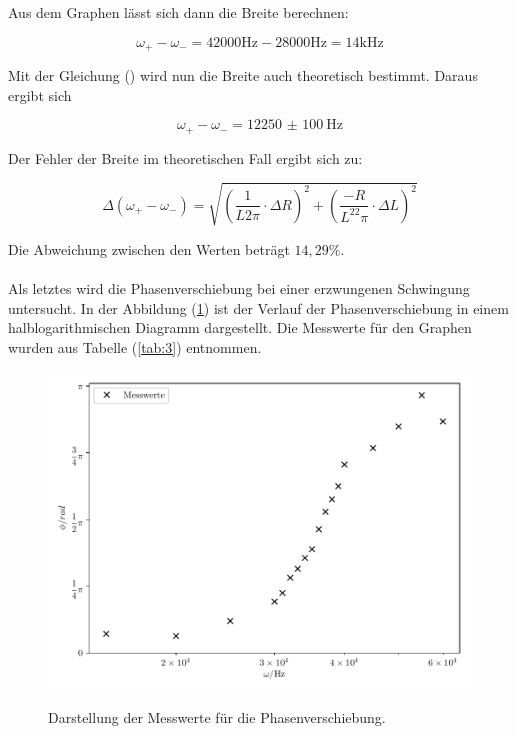 Aus dem Graphen lässt sich dann die Breite berechnen:

\begin{equation*}
  \omega_+ - \omega_- = 42000 \si{\Hz} - 28000 \si{\Hz} = 14 \si{\kilo\Hz}
\end{equation*}

Mit der Gleichung () wird nun die Breite auch theoretisch bestimmt. Daraus ergibt sich

\begin{equation*}
  \omega_+ - \omega_- = \SI{12250(100)}{\Hz}
\end{equation*}

Der Fehler der Breite im theoretischen Fall ergibt sich zu:

\begin{equation*}
  \Delta(\omega_+ - \omega_-) = \sqrt{\left(\frac{1}{L2\pi} \cdot \Delta R \right)^2 +
  \left(\frac{-R}{L^22\pi} \cdot \Delta L\right)^2}
\end{equation*}

Die Abweichung zwischen den Werten beträgt $14,29 \% $.\\\\

Als letztes wird die Phasenverschiebung \phi bei einer erzwungenen Schwingung untersucht.
In der Abbildung (\ref{fig:10}) ist der Verlauf der Phasenverschiebung in einem
halblogarithmischen Diagramm dargestellt. Die Messwerte für den Graphen wurden aus
Tabelle (\ref{tab:3}) entnommen.

\begin{figure}[H]
  \centering
  \caption{Darstellung der Messwerte für die Phasenverschiebung.}
  \includegraphics[width=\textwidth]{plot4.pdf}
  \label{fig:10}
\end{figure}

